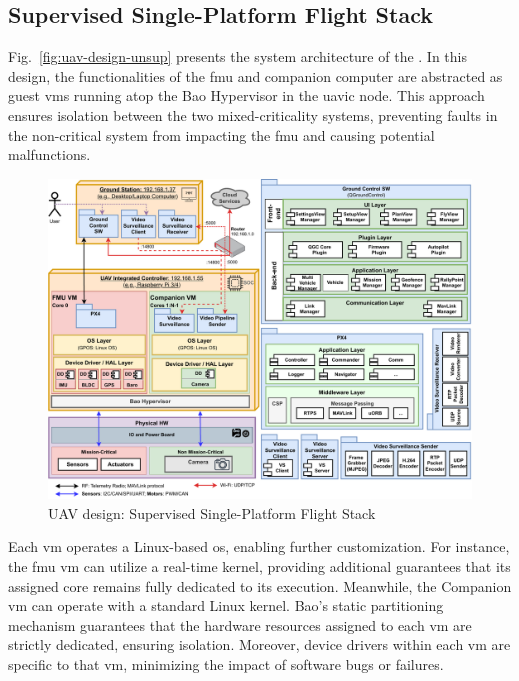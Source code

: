 \subsection{Supervised Single-Platform Flight Stack}
\label{sec:superv-stack}
Fig.~\ref{fig:uav-design-unsup} presents the system architecture of the
. In this design, the functionalities of the \gls{fmu} and
companion computer are abstracted as guest \glspl{vm} running atop the Bao
Hypervisor in the \gls{uavic} node. This approach ensures isolation between the two mixed-criticality
systems, preventing faults in the non-critical system from impacting the
\gls{fmu} and causing potential malfunctions.

\begin{figure}[!hbt]
  \centering
  \includegraphics[width=1.0\textwidth]{./img/pdf/uav-main-design-sup.pdf} 
%   
  \caption{UAV design: Supervised Single-Platform Flight Stack}%
  \label{fig:uav-design-sup}
\end{figure}

Each \gls{vm} operates a Linux-based \gls{os}, enabling further customization. For instance, the \gls{fmu} \gls{vm} can utilize a real-time kernel, providing additional guarantees that its assigned core remains fully dedicated to its execution. Meanwhile, the Companion \gls{vm} can operate with a standard Linux kernel. Bao's static partitioning mechanism guarantees that the hardware resources assigned to each \gls{vm} are strictly dedicated, ensuring isolation. Moreover, device drivers within each \gls{vm} are specific to that \gls{vm}, minimizing the impact of software bugs or failures.

